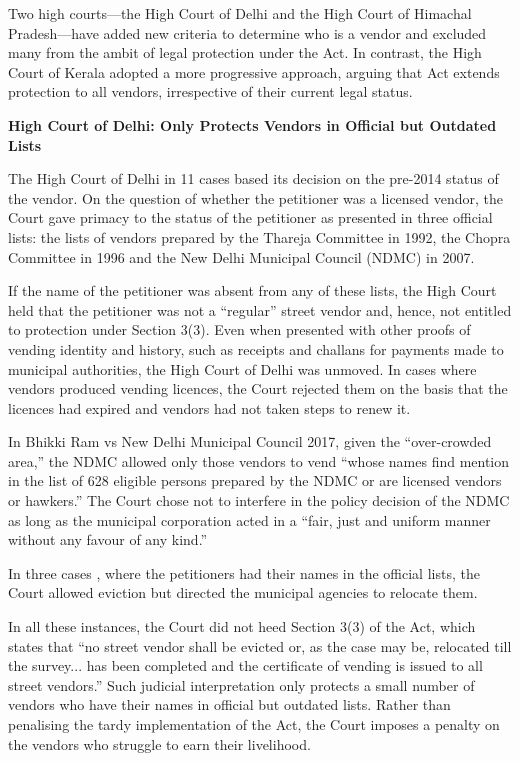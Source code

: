 \documentclass[a4paper, 12pt, twoside]{article}
\begin{document}
Two high courts—the High Court of Delhi and the High Court of Himachal Pradesh—have added new criteria to determine who is a vendor and excluded many from the ambit of legal protection under the Act. In contrast, the High Court of Kerala adopted a more progressive approach, arguing that Act extends protection to all vendors, irrespective of their current legal status.

\textbf{High Court of Delhi: Only Protects Vendors in Official but Outdated Lists}

The High Court of Delhi in 11 cases  based its decision on the pre-2014 status of the vendor. On the question of whether the petitioner was a licensed vendor, the Court gave primacy to the status of the petitioner as presented in three official lists: the lists of vendors prepared by the Thareja Committee in 1992, the Chopra Committee in 1996 and the New Delhi Municipal Council (NDMC) in 2007. 

If the name of the petitioner was absent from any of these lists, the High Court held that the petitioner was not a “regular” street vendor and, hence, not entitled to protection under Section 3(3). Even when presented with other proofs of vending identity and history, such as receipts  and challans for payments made to municipal authorities, the High Court of Delhi was unmoved. In cases where vendors produced vending licences, the Court rejected them on the basis that the licences had expired and vendors had not taken steps to renew it. 

In Bhikki Ram vs New Delhi Municipal Council 2017, given the “over-crowded area,” the NDMC allowed only those vendors to vend “whose names find mention in the list of 628 eligible persons prepared by the NDMC or are licensed vendors or hawkers.” The Court chose not to interfere in the policy decision of the NDMC as long as the municipal corporation acted in a “fair, just and uniform manner without any favour of any kind.”

In three cases , where the petitioners had their names in the official lists, the Court allowed eviction but directed the municipal agencies to relocate them. 

In all these instances, the Court did not heed Section 3(3) of the Act, which states that “no street vendor shall be evicted or, as the case may be, relocated till the survey... has been completed and the certificate of vending is issued to all street vendors.” Such judicial interpretation only protects a small number of vendors who have their names in official but outdated lists. Rather than penalising the tardy implementation of the Act, the Court imposes a penalty on the vendors who struggle to earn their livelihood. 
\end{document}
